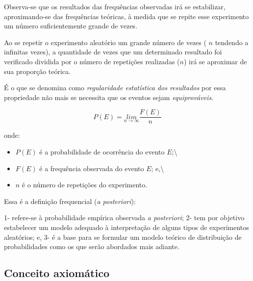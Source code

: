 \documentclass[
]{book}
\providecommand{\tightlist}{%
  \setlength{\itemsep}{0pt}\setlength{\parskip}{0pt}}
\begin{document}
\hfill\break

Observa-se que os resultados das frequências observadas irá se estabilizar, aproximando-se das frequências teóricas, à medida que se repite esse experimento um número suficientemente grande de vezes.

\hfill\break

Ao se repetir o experimento aleatório um grande número de vezes ( \(n\) tendendo a infinitas vezes), a quantidade de vezes que um determinado resultado foi verificado dividida por o número de repetições realizadas (\(n\)) irá se aproximar de sua proporção teórica.

\hfill\break

É o que se denomina como \emph{regularidade estatística dos resultados} por essa propriedade não mais se necessita que os eventos sejam \emph{equiprováveis}.

\hfill\break

\[
P\left(E\right)=\underset{n\to \infty }{lim}{\frac{F(E)}{n}}
\]

\hfill\break

onde:

\hfill\break

\begin{itemize}
\tightlist
\item
  \(P(E)\) é a probabilidade de ocorrência do evento \(E\);\textbackslash{}
\item
  \(F(E)\) é a frequência observada do evento \(E\); e,\textbackslash{}
\item
  \(n\) é o número de repetições do experimento.
\end{itemize}

\hfill\break

Essa é a definição frequencial (\emph{a posteriori}):

\hfill\break

1- refere-se à probabilidade empírica observada \emph{a posteriori};
2- tem por objetivo estabelecer um modelo adequado à interpretação de alguns tipos de experimentos aleatórios; e,
3- é a base para se formular um modelo teórico de distribuição de probabilidades como os que serão abordados mais adiante.

\hfill\break

\hypertarget{conceito-axiomuxe1tico}{%
\subsection{Conceito axiomático}\label{conceito-axiomuxe1tico}}
\end{document}
